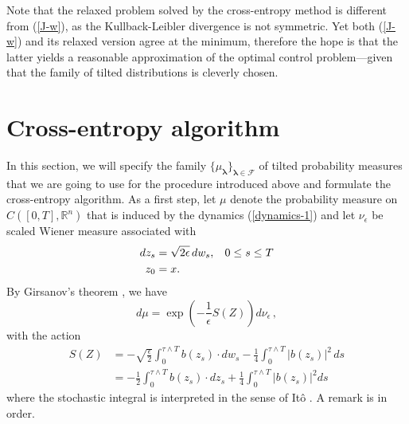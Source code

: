 \documentclass[final]{siamltex}
\newcommand{\cF}{{\mathcal F}}
\newcommand{\R}{{\mathbb R}}
\newcommand{\eps}{\epsilon}
\newcommand{\blambda}{\bm{\lambda}}
\begin{document}
Note that the relaxed problem solved by the cross-entropy method is different from (\ref{J-w}), as the Kullback-Leibler divergence is not symmetric. Yet both (\ref{J-w}) and its relaxed version agree at the minimum, therefore the hope is that the latter yields a reasonable approximation of the optimal control problem---given that the family of tilted distributions is cleverly chosen. 

\FloatBarrier


\section{Cross-entropy algorithm}
\label{sec-ce-algo}

In this section, we will specify the family  $\{\mu_{\blambda}\}_{\blambda \in
\cF}$ of tilted probability measures that we are going to use for the
procedure introduced above and formulate the cross-entropy algorithm. As a
first step, let $\mu$  denote the probability measure on $C([0,T],\R^{n})$
that is induced by the dynamics (\ref{dynamics-1}) and let $\nu_{\eps}$ be scaled Wiener measure associated with 
\begin{align}
  \begin{split}
  dz_s &= \sqrt{2\eps }\,dw_s, \hspace{3mm} 0 \le  s \le T \\
   z_0 &= x .
  \end{split}
\end{align}
By Girsanov's theorem \cite{oksendalSDE}, we have 
\begin{equation}\label{girsanov1}
  {d\mu}= \exp\left(-\frac{1}{\eps}S(Z)\right) d\nu_{\eps}\,, 
\end{equation}
with the action
\begin{equation}\label{girsanov2}
\begin{aligned}
  S(Z) & = -\sqrt{\frac{\eps}{2}}\int_0^{\tau\wedge T}
  b(z_s)\cdot dw_s - \frac{1}{4}\int_0^{\tau\wedge T} |b(z_s)|^2\,ds\\
  &=-\frac{1}{2}\int_0^{\tau\wedge T} b(z_s)\cdot dz_s +
  \frac{1}{4}\int_0^{\tau\wedge T} |b(z_s)|^2ds \,
\end{aligned}
\end{equation}
where the stochastic integral is interpreted in the sense of It\^o \cite{oksendalSDE}.
%
A remark is in order. 
\end{document}
